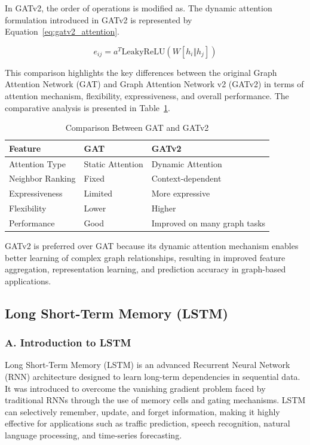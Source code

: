 In GATv2, the order of operations is modified as. The dynamic attention formulation introduced in GATv2 is represented by Equation~\eqref{eq:gatv2_attention}.

\begin{equation}
e_{ij}=a^{T}\text{LeakyReLU}\left(W[h_i \Vert h_j]\right)
\label{eq:gatv2_attention}
\end{equation}

This comparison highlights the key differences between the original Graph Attention Network (GAT) and Graph Attention Network v2 (GATv2) in terms of attention mechanism, flexibility, expressiveness, and overall performance. The comparative analysis is presented in Table~\ref{tab:gat_vs_gatv2}.

\begin{table}[H]
\centering
\caption{Comparison Between GAT and GATv2}
\label{tab:gat_vs_gatv2}
\vspace{0.2cm}

\begin{tabular}{|p{4cm}|p{4.5cm}|p{4.5cm}|}
\hline
\textbf{Feature} & \textbf{GAT} & \textbf{GATv2} \\
\hline
Attention Type & Static Attention & Dynamic Attention \\
\hline
Neighbor Ranking & Fixed & Context-dependent \\
\hline
Expressiveness & Limited & More expressive \\
\hline
Flexibility & Lower & Higher \\
\hline
Performance & Good & Improved on many graph tasks \\
\hline
\end{tabular}
\end{table}

GATv2 is preferred over GAT because its dynamic attention mechanism enables better learning of complex graph relationships, resulting in improved feature aggregation, representation learning, and prediction accuracy in graph-based applications.

\subsection{Long Short-Term Memory (LSTM)}

\subsubsection{A.   Introduction to LSTM}

Long Short-Term Memory (LSTM) is an advanced Recurrent Neural Network (RNN) architecture designed to learn long-term dependencies in sequential data. It was introduced to overcome the vanishing gradient problem faced by traditional RNNs through the use of memory cells and gating mechanisms. LSTM can selectively remember, update, and forget information, making it highly effective for applications such as traffic prediction, speech recognition, natural language processing, and time-series forecasting.

